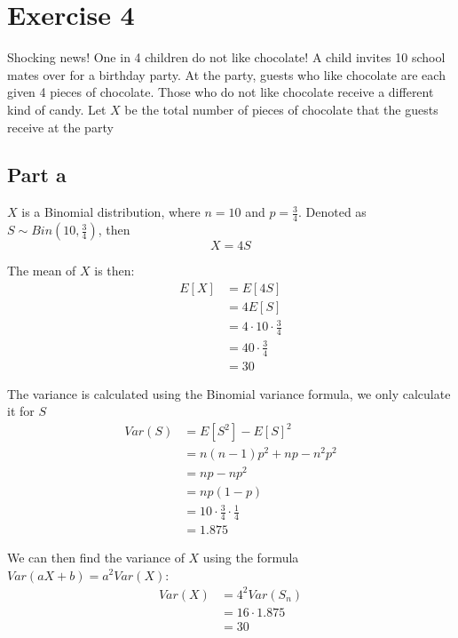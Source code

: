 \section{Exercise 4}
Shocking news! One in 4 children do not like chocolate!
A child invites 10 school mates over for a birthday party. At the party, guests who like chocolate are each given 4 pieces of chocolate. Those who do not like chocolate receive a different kind of candy. Let $X$ be the total number of pieces of chocolate that the guests receive at the party

\subsection{Part a}

$X$ is a Binomial distribution, where $n = 10$ and $p = \frac{3}{4}$. Denoted as $S\sim Bin(10, \frac{3}{4})$, then
\[
	X = 4S
\]

The mean of $X$ is then:
\begin{align*}
	E[X] & = E[4S]                        \\
	     & = 4E[S]                        \\
	     & = 4 \cdot 10 \cdot \frac{3}{4} \\
	     & = 40 \cdot \frac{3}{4}         \\
	     & = 30
\end{align*}

The variance is calculated using the Binomial variance formula, we only calculate it for $S$
\begin{align*}
	Var(S) & = E[S^2]-E[S]^2                          \\
	       & = n(n-1)p^2+np - n^2p^2                  \\
	       & = np-np^2                                \\
	       & = np(1-p)                                \\
	       & = 10 \cdot \frac{3}{4} \cdot \frac{1}{4} \\
	       & = 1.875
\end{align*}

We can then find the variance of $X$ using the formula $Var(aX+b) = a^2Var(X)$:
\begin{align*}
	Var(X) & = 4^2Var(S_n)    \\
	       & = 16 \cdot 1.875 \\
	       & = 30
\end{align*}

